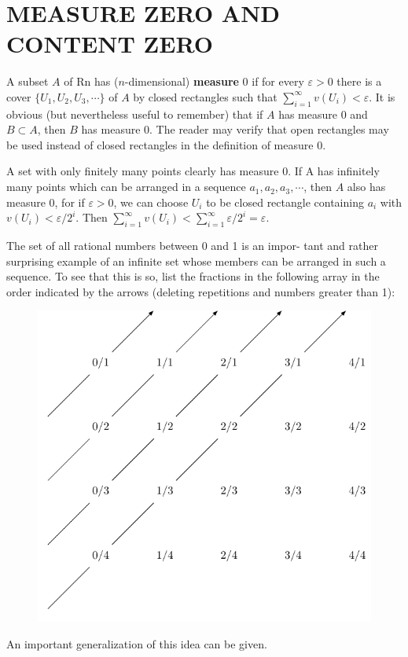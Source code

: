 \clearpage
\section[\textsc{measure zero and content zero}]{MEASURE ZERO AND CONTENT ZERO}
A subset $A$ of Rn has ($n$-dimensional) \textbf{measure} 0 if for every
$\varepsilon > 0$ there is a cover $\{U_1, U_2, U_3, \cdots \}$ of $A$ by 
closed rectangles such that $\sum_{i=1}^{\infty}{v(U_i)}< \varepsilon$.
It is obvious (but nevertheless useful to remember) that if $A$ has measure 0 and
$B \subset A$, then $B$ has measure 0.
The reader may verify that open rectangles may be used instead of closed rectangles in
the definition of measure 0.

A set with only finitely many points clearly has measure 0.
If A has infinitely many points which can be arranged in a
sequence $a_1, a_2, a_3,\cdots$, then $A$ also has measure 0, 
for if $\varepsilon>0$, we can choose $U_i$ to be closed rectangle
containing $a_i$ with $v(U_i)< \varepsilon/2^i$. Then 
$\sum_{i=1 }^{\infty}{v(U_i)} < \sum_{i=1 }^{\infty}{\varepsilon/2^i} = \varepsilon$.

The set of all rational numbers between 0 and 1 is an impor-
tant and rather surprising example of an infinite set whose
members can be arranged in such a sequence.
To see that this is so, list the fractions in the following array in the order
indicated by the arrows (deleting repetitions and numbers
greater than 1):

\begin{figure}[H]
    \centering
    \includegraphics[width=.65\linewidth]{./pics/Fig3-(1).pdf}
\end{figure}

An important generalization of this idea can be given.

